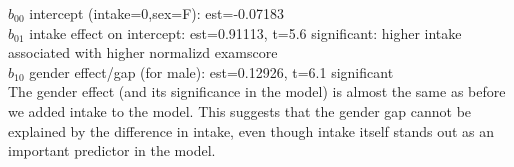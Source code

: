 \documentclass{article}\usepackage{graphicx, color}
\begin{document}
$b_{00}$ intercept (intake=0,sex=F): est=-0.07183\\
$b_{01}$ intake effect on intercept: est=0.91113, t=5.6 significant: higher intake associated with higher normalizd examscore\\
$b_{10}$ gender effect/gap (for male): est=0.12926, t=6.1 significant\\

The gender effect (and its significance in the model) is almost the same as before we added intake to the model. This suggests that the gender gap cannot be explained by the difference in intake, even though intake itself stands out as an important predictor in the model.
\end{document}

